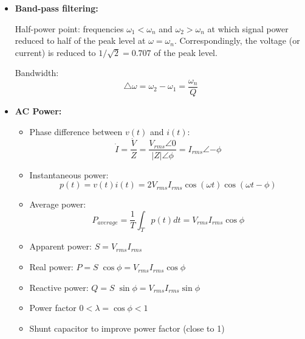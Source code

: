 \begin{itemize}
	{\bf Quality factor:} 
\[	Q=\frac{\omega_n C}{G}=\frac{1}{\omega_n LG}=\frac{1}{G}\sqrt{\frac{C}{L}} \]

\[	\dot{I}_R=\dot{I},\;\;\;\;\dot{I}_C=jQ\dot{I},\;\;\;\;\;\dot{I}_L=-jQ\dot{I} \]
\item {\bf Band-pass filtering:}

	Half-power point: frequencies $\omega_1<\omega_n$ and $\omega_2>\omega_n$
	at which signal power reduced to half of the peak level at $\omega=\omega_n$.
	Correspondingly, the voltage (or current) is reduced to $1/\sqrt{2}=0.707$
	of the peak level.

	Bandwidth: \[ \triangle \omega=\omega_2-\omega_1=\frac{\omega_n}{Q} \]

\item {\bf AC Power:}
\begin{itemize}
\item Phase difference between $v(t)$ and $i(t)$:
	\[ \dot{I}=\frac{\dot{V}}{Z}=\frac{V_{rms}\angle 0}{|Z|\angle{\phi}}
		=I_{rms}\angle{-\phi}	\]
\item Instantaneous power:	
	\[ p(t)=v(t) i(t)=2V_{rms}I_{rms}\cos(\omega t)\cos(\omega t-\phi) \]
\item Average power:
	\[ P_{average}=\frac{1}{T}\int_T p(t) dt=V_{rms}I_{rms} \cos \phi \]
\item Apparent power: $ S=V_{rms} I_{rms}$
\item Real power: $P=S \; \cos\phi=V_{rms} I_{rms} \cos \phi$
\item Reactive power: $Q=S \; \sin\phi=V_{rms} I_{rms} \sin \phi$
\item Power factor $0 < \lambda=\cos \phi < 1$
\item Shunt capacitor to improve power factor (close to 1)
\end{itemize}


\end{itemize}
